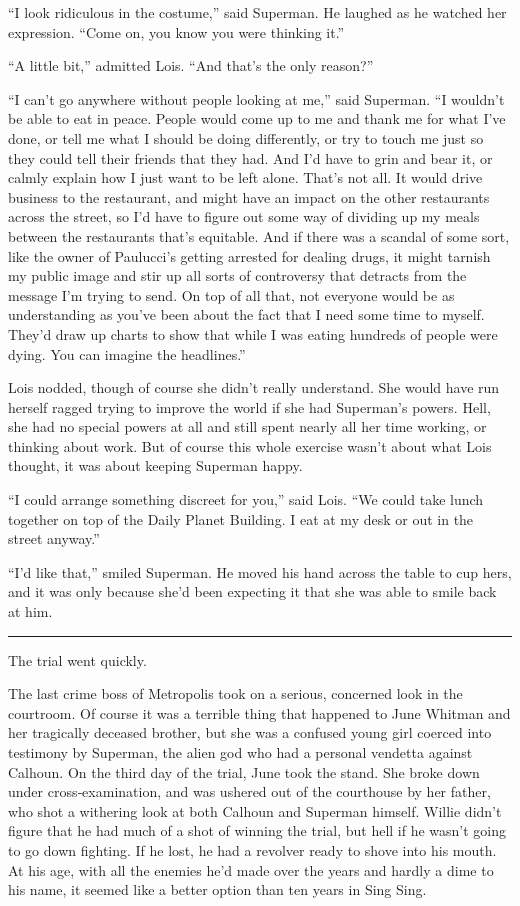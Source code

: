 \documentclass[ebook,12pt]{memoir}
\begin{document}
``I look ridiculous in the costume,'' said Superman. He laughed as he
watched her expression. ``Come on, you know you were thinking it.''

``A little bit,'' admitted Lois. ``And that's the only reason?''

``I can't go anywhere without people looking at me,'' said Superman. ``I
wouldn't be able to eat in peace. People would come up to me and thank
me for what I've done, or tell me what I should be doing differently, or
try to touch me just so they could tell their friends that they had. And
I'd have to grin and bear it, or calmly explain how I just want to be
left alone. That's not all. It would drive business to the restaurant,
and might have an impact on the other restaurants across the street, so
I'd have to figure out some way of dividing up my meals between the
restaurants that's equitable. And if there was a scandal of some sort,
like the owner of Paulucci's getting arrested for dealing drugs, it
might tarnish my public image and stir up all sorts of controversy that
detracts from the message I'm trying to send. On top of all that, not
everyone would be as understanding as you've been about the fact that I
need some time to myself. They'd draw up charts to show that while I was
eating hundreds of people were dying. You can imagine the headlines.''

Lois nodded, though of course she didn't really understand. She would
have run herself ragged trying to improve the world if she had
Superman's powers. Hell, she had no special powers at all and still
spent nearly all her time working, or thinking about work. But of course
this whole exercise wasn't about what Lois thought, it was about keeping
Superman happy.

``I could arrange something discreet for you,'' said Lois. ``We could
take lunch together on top of the Daily Planet Building. I eat at my
desk or out in the street anyway.''

``I'd like that,'' smiled Superman. He moved his hand across the table
to cup hers, and it was only because she'd been expecting it that she
was able to smile back at him.

\begin{center}\rule{0.5\linewidth}{\linethickness}\end{center}

The trial went quickly.

The last crime boss of Metropolis took on a serious, concerned look in
the courtroom. Of course it was a terrible thing that happened to June
Whitman and her tragically deceased brother, but she was a confused
young girl coerced into testimony by Superman, the alien god who had a
personal vendetta against Calhoun. On the third day of the trial, June
took the stand. She broke down under cross‐examination, and was ushered
out of the courthouse by her father, who shot a withering look at both
Calhoun and Superman himself. Willie didn't figure that he had much of a
shot of winning the trial, but hell if he wasn't going to go down
fighting. If he lost, he had a revolver ready to shove into his mouth.
At his age, with all the enemies he'd made over the years and hardly a
dime to his name, it seemed like a better option than ten years in Sing
Sing.
\end{document}
